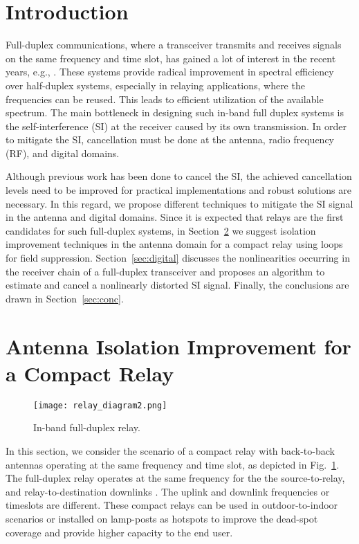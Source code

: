 \documentclass[conference,twoside,letterpaper,10pt]{IEEEtran}
\begin{document}
\IEEEpeerreviewmaketitle

\section{Introduction}
Full-duplex communications, where a transceiver transmits and receives signals on the same frequency and time slot, has gained a lot of interest in the recent years, e.g., \cite{bliss,Choi10,Duarte12,Jain11,Bharadia13,Riihonen12,Riihonen1222}. These systems provide radical improvement in spectral efficiency over half-duplex systems, especially in relaying applications, where the frequencies can be reused. This leads to efficient utilization of the available spectrum. The main bottleneck in designing such in-band full duplex systems is the self-interference (SI) at the receiver caused by its own transmission. In order to mitigate the SI, cancellation must be done at the antenna, radio frequency (RF), and digital domains.

Although previous work has been done to cancel the SI, the achieved cancellation levels need to be improved for practical implementations and robust solutions are necessary. In this regard, we propose different techniques to mitigate the SI signal in the antenna and digital domains. Since it is expected that relays are the first candidates for such full-duplex systems, in Section~\ref{sec:antenna} we suggest isolation improvement techniques in the antenna domain for a compact relay using loops for field suppression. Section~\ref{sec:digital} discusses the nonlinearities occurring in the receiver chain of a full-duplex transceiver and proposes an algorithm to estimate and cancel a nonlinearly distorted SI signal. Finally, the conclusions are drawn in Section~\ref{sec:conc}.

\section{Antenna Isolation Improvement for a Compact Relay}
\label{sec:antenna}

\begin{figure}[!b]
\centering
\texttt{[image: relay\_diagram2.png]}\caption{In-band full-duplex relay.}
\label{fig:relay_diagram}
\end{figure}

In this section, we consider the scenario of a compact relay with back-to-back antennas operating at the same frequency and time slot, as depicted in Fig.~\ref{fig:relay_diagram}. The full-duplex relay operates at the same frequency for the the source-to-relay, and relay-to-destination downlinks \cite{Riihonen124}. The uplink and downlink frequencies or timeslots are different. These compact relays can be used in outdoor-to-indoor scenarios or installed on lamp-posts as hotspots to improve the dead-spot coverage and provide higher capacity to the end user. 
\end{document}

